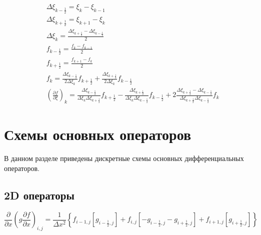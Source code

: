 \documentclass[12pt, a4paper]{article}
\newcommand\onehalf{\frac{1}{2}} %
\begin{document}
\begin{equation*}
    \begin{split}
        &
        \Delta \xi_{k - \onehalf}
        =
        \xi_{k} - \xi_{k - 1}
        \\
        &
        \Delta \xi_{k + \onehalf}
        =
        \xi_{k + 1} - \xi_{k}
        \\
        &
        \Delta \xi_{k}
        =
        \frac
            {\Delta \xi_{k + \onehalf} - \Delta \xi_{k - \onehalf}}
            {2}
        \\
        &
        f_{k - \onehalf}
        =
        \frac
            {f_{k} - f_{k - 1}}
            {2}
        \\
        &
        f_{k + \onehalf}
        =
        \frac
            {f_{k + 1} - f_{k}}
            {2}
        \\
        &
        f_{k}
        =
        \frac
            {\Delta \xi_{k - \onehalf}}
            {2 \Delta \xi_{k}}
        f_{k + \onehalf}
        +
        \frac
            {\Delta \xi_{k + \onehalf}}
            {2 \Delta \xi_{k}}
        f_{k - \onehalf}
        \\
        &
        {\left(
            \frac
                {\partial f}
                {\partial \xi}
        \right)}_{k}
        =
        \frac
            {\Delta \xi_{k - \onehalf}}
            {\Delta \xi_{k} \Delta \xi_{k + \onehalf}}
        f_{k + \onehalf}
        -
        \frac
            {\Delta \xi_{k + \onehalf}}
            {\Delta \xi_{k} \Delta \xi_{k - \onehalf}}
        f_{k - \onehalf}
        +
        2
        \frac
            {\Delta \xi_{k + \onehalf} - \Delta \xi_{k - \onehalf}}
            {\Delta \xi_{k + \onehalf} \Delta \xi_{k - \onehalf}}
        f_{k}
    \end{split}
\end{equation*}

\section*{Схемы основных операторов}

В данном разделе приведены дискретные схемы основных дифференциальных операторов.

\subsection*{2D операторы}

\begin{equation*}
	\left.
        \frac
	        {\partial }
	        {\partial x}
	    \left(
	        g
	    	\frac
	    	    {\partial f}
	    	    {\partial x}
	    \right)
	\right._{i, j}
	=
	\frac
	    {1}
	    {\Delta x^2}
	\left\{
	    f_{i - 1, j}
	    \left[
		    g_{i - \onehalf, j}
		\right]
	    +
	    f_{i, j}
	    \left[
		    -
            g_{i - \onehalf, j}
		    -
            g_{i + \onehalf, j}
	    \right]
	    +
	    f_{i + 1,j}
	    \left[
		    g_{i + \onehalf, j}
	    \right]
	\right\}
\end{equation*}
\end{document}
